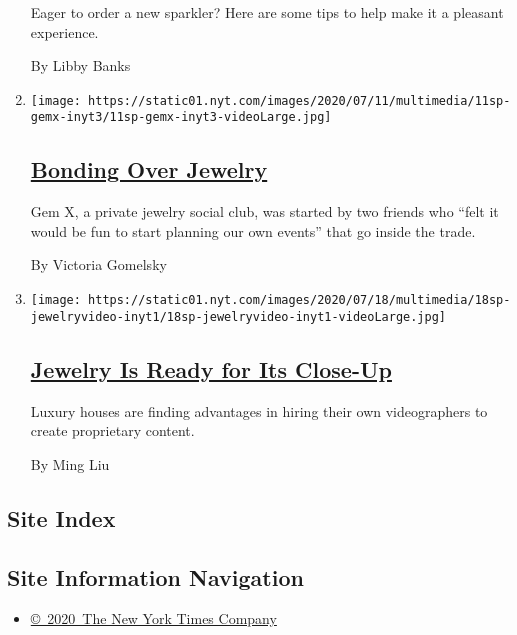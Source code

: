 \begin{enumerate}
  Eager to order a new sparkler? Here are some tips to help make it a
  pleasant experience.

  By Libby Banks
\item
  \texttt{[image: https://static01.nyt.com/images/2020/07/11/multimedia/11sp-gemx-inyt3/11sp-gemx-inyt3-videoLarge.jpg]}

  \hypertarget{bonding-over-jewelry}{%
  \subsection{\texorpdfstring{\href{/2020/07/10/fashion/jewelry-gemx-social-club.html}{Bonding
  Over Jewelry}}{Bonding Over Jewelry}}\label{bonding-over-jewelry}}

  Gem X, a private jewelry social club, was started by two friends who
  ``felt it would be fun to start planning our own events'' that go
  inside the trade.

  By Victoria Gomelsky
\item
  \texttt{[image: https://static01.nyt.com/images/2020/07/18/multimedia/18sp-jewelryvideo-inyt1/18sp-jewelryvideo-inyt1-videoLarge.jpg]}

  \hypertarget{jewelry-is-ready-for-its-close-up}{%
  \subsection{\texorpdfstring{\href{/2020/07/17/fashion/jewelry-video-garrard-graff.html}{Jewelry
  Is Ready for Its
  Close-Up}}{Jewelry Is Ready for Its Close-Up}}\label{jewelry-is-ready-for-its-close-up}}

  Luxury houses are finding advantages in hiring their own videographers
  to create proprietary content.

  By Ming Liu
\end{enumerate}

\hypertarget{site-index}{%
\subsection{Site Index}\label{site-index}}

\hypertarget{site-information-navigation}{%
\subsection{Site Information
Navigation}\label{site-information-navigation}}

\begin{itemize}
\tightlist
\item
  \href{https://help.nytimes.com/hc/en-us/articles/115014792127-Copyright-notice}{©~2020~The
  New York Times Company}
\end{itemize}

